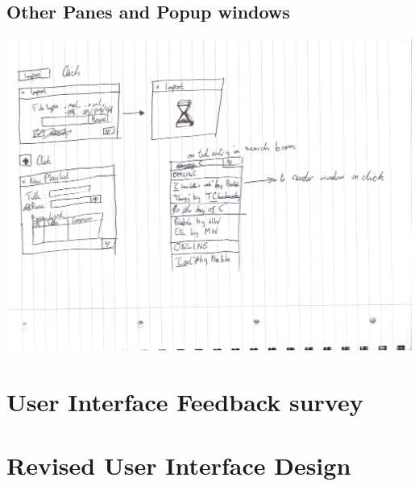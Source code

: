 \begin{appendices}
\subsection{Other Panes and Popup windows}
\includegraphics[width=500pt]{other_panes_and_popups}
\section{User Interface Feedback survey}
\section{Revised User Interface Design}
\end{appendices}